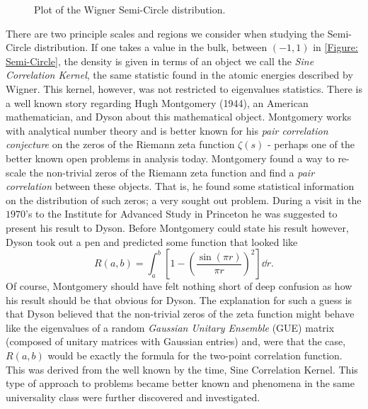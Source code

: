 \begin{figure}[h!]
	\centering
	\caption{Plot of the Wigner Semi-Circle distribution.}
	\label{Figure: Semi-Circle}
\end{figure}

There are two principle scales and regions we consider when studying the Semi-Circle distribution. If one takes a value in the bulk, between $(-1,1)$ in \autoref{Figure: Semi-Circle}, the density is given in terms of an object we call the \textit{Sine Correlation Kernel}, the same statistic found in the atomic energies described by Wigner. This kernel, however, was not restricted to  eigenvalues statistics. There is a well known story regarding Hugh Montgomery (1944), an American mathematician, and Dyson about this mathematical object. Montgomery works with analytical number theory and is better known for his \textit{pair correlation conjecture} on the zeros of the Riemann zeta function $\zeta(s)$ - perhaps one of the better known open problems in analysis today. Montgomery found a way to re-scale the non-trivial zeros of the Riemann zeta function and find a \textit{pair correlation} between these objects. That is, he found some statistical information on the distribution of such zeros; a very sought out problem. During a visit in the $1970$'s to the Institute for Advanced Study in Princeton he was suggested to present his result to Dyson. Before Montgomery could state his result however, Dyson took out a pen and predicted some function that looked like
\begin{equation}
	R(a, b) = \int_{a}^{b} \left[ 1 - \left( \frac{\sin(\pi r)}{\pi r}\right)^2 \right] \dd r.
\end{equation}
Of course, Montgomery should have felt nothing short of deep confusion as how his result should be that obvious for Dyson. The explanation for such a guess is that Dyson believed that the non-trivial zeros of the zeta function might behave like the eigenvalues of a random \textit{Gaussian Unitary Ensemble} (GUE) matrix (composed of unitary matrices with Gaussian entries) and, were that the case, $R(a, b)$ would be exactly the formula for the two-point correlation function. This was derived from the well known by the time, Sine Correlation Kernel. This type of approach to problems became better known and phenomena in the same universality class were further discovered and investigated.

